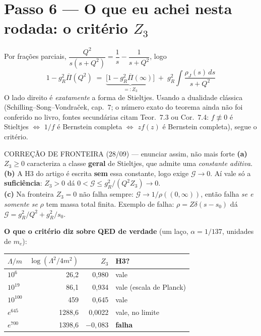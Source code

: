 \documentclass[11pt,a4paper]{article}
\begin{document}
\section*{Passo 6 --- O que eu achei nesta rodada: o critério $Z_3$}

Por frações parciais, $\dfrac{Q^2}{s(s+Q^2)}=\dfrac1s-\dfrac1{s+Q^2}$, logo
\[
  \boxed{\;1-g_R^2\overline{\Pi}(Q^2)
   \;=\;\underbrace{\bigl[1-g_R^2\overline{\Pi}(\infty)\bigr]}_{\textstyle =:Z_3}
   \;+\;g_R^2\!\int\!\frac{\rho_J(s)\,ds}{s+Q^2}\;}
\]
O lado direito é \emph{exatamente} a forma de Stieltjes. Usando a dualidade
clássica (Schilling--Song--Vondra\v{c}ek, cap.~7; o número exato do teorema
ainda não foi conferido no livro, fontes secundárias citam Teor.~7.3 ou
Cor.~7.4: $f\not\equiv0$ é Stieltjes
$\iff$ $1/f$ é Bernstein completa $\iff$ $z f(z)$ é Bernstein completa),
segue o critério.

\begin{alerta}{CORREÇÃO DE FRONTEIRA (28/09) --- enunciar assim, não mais forte}
\textbf{(a)} $Z_3\ge0$ caracteriza a classe \textbf{geral} de Stieltjes, que
admite uma \emph{constante aditiva}.\\
\textbf{(b)} A H3 do artigo é escrita \textbf{sem} essa constante, logo exige
$\mathcal{G}\to0$. Aí vale só a \textbf{suficiência}: $Z_3>0$ dá
$0<\mathcal{G}\le g_R^2/(Q^2Z_3)\to0$.\\
\textbf{(c)} Na fronteira $Z_3=0$ não falha sempre: $\mathcal{G}\to1/\rho((0,\infty))$,
então falha \emph{se e somente se} $\rho$ tem massa total finita.
Exemplo de falha: $\rho=Z\delta(s-s_0)$ dá $\mathcal{G}=g_R^2/Q^2+g_R^2/s_0$.
\end{alerta}

\textbf{O que o critério diz sobre QED de verdade} (um laço, $\alpha=1/137$,
unidades de $m_e$):

\begin{center}\small
\begin{tabular}{lrrl}
\toprule
$\Lambda/m$ & $\log(\Lambda^2/4m^2)$ & $Z_3$ & H3? \\
\midrule
$10^{6}$    & 26{,}2   & 0{,}980  & vale \\
$10^{19}$   & 86{,}1   & 0{,}934  & vale (escala de Planck) \\
$10^{100}$  & 459      & 0{,}645  & vale \\
$e^{645}$   & 1288{,}6 & 0{,}0022 & vale, no limite \\
$e^{700}$   & 1398{,}6 & $-0{,}083$ & \textbf{falha} \\
\bottomrule
\end{tabular}
\end{center}
\end{document}

